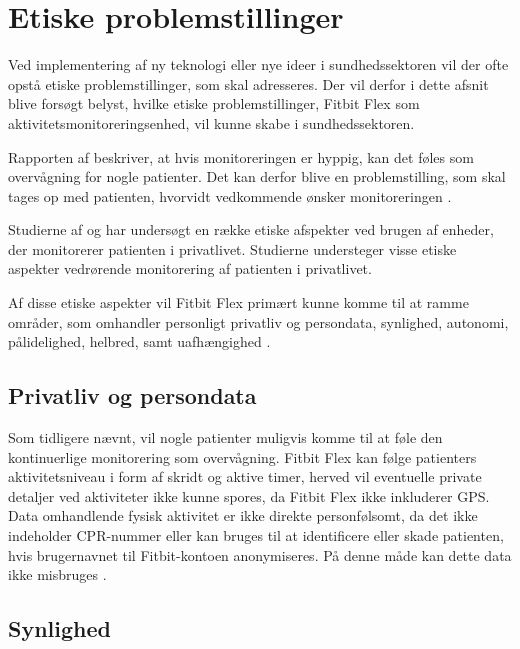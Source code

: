 \section{Etiske problemstillinger}

Ved implementering af ny teknologi eller nye ideer i sundhedssektoren vil der ofte opstå etiske problemstillinger, som skal adresseres. Der vil derfor i dette afsnit blive forsøgt belyst, hvilke etiske problemstillinger, Fitbit Flex som aktivitetsmonitoreringsenhed, vil kunne skabe i sundhedssektoren.

Rapporten af \citeauthor{patienthome2015} beskriver, at hvis monitoreringen er hyppig, kan det føles som overvågning for nogle patienter. Det kan derfor blive en problemstilling, som skal tages op med patienten, hvorvidt vedkommende ønsker monitoreringen \citep{patienthome2015, SundhedsstyrelsenPatientersRetsstilling2016}.

Studierne af \citeauthor{Mittelstand2011} og \citeauthor{Nordgren2013} har undersøgt en række etiske afspekter ved brugen af enheder, der monitorerer patienten i privatlivet. Studierne understeger visse etiske aspekter vedrørende monitorering af patienten i privatlivet.

Af disse etiske aspekter vil Fitbit Flex primært kunne komme til at ramme områder, som omhandler personligt privatliv og persondata, synlighed, autonomi, pålidelighed, helbred, samt uafhængighed \citep{Mittelstand2011, Nordgren2013}.


\subsection{Privatliv og persondata}

Som tidligere nævnt, vil nogle patienter muligvis komme til at føle den kontinuerlige monitorering som overvågning. Fitbit Flex kan følge patienters aktivitetsniveau i form af skridt og aktive timer, herved vil eventuelle private detaljer ved aktiviteter ikke kunne spores, da Fitbit Flex ikke inkluderer GPS.
Data omhandlende fysisk aktivitet er ikke direkte personfølsomt, da det ikke indeholder CPR-nummer eller kan bruges til at identificere eller skade patienten, hvis brugernavnet til Fitbit-kontoen anonymiseres. På denne måde kan dette data ikke misbruges \citep{Mittelstand2011}.


\subsection{Synlighed}

